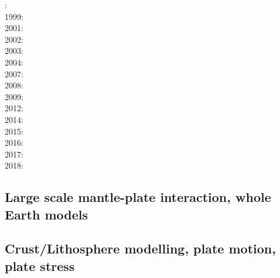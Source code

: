 {\scriptsize
{}: \cite{cava98}\\
1999: \cite{samb99}\cite{samb99b}\\
2001: \cite{bomo01}\cite{kapo01}\\
2002: \cite{shri02}\cite{burb02}\\
2003: \cite{buht03}\\
2004: \cite{isst04}\\
2007: \cite{isks07}\\
2008: \cite{splg08}\cite{ligu08}\\
2009: \cite{wama09}\cite{splg09}\cite{sifg09}\\
2012: \cite{naco12}\\
2014: \cite{wosp14}\cite{hobo14}\cite{licl14}\\
2015: \cite{wahg15}\cite{cobs15}\cite{vybu15}\\
2016: \cite{ghbu16}\cite{bocf16}\cite{yagu16}\cite{baum16}\\
2017: \cite{ligs17}\\
2018: \cite{bofc18}\cite{ghbu18}\cite{cogb18}\cite{ghmc18}
}

\subsection{Large scale mantle-plate interaction, whole Earth models}

\cite{yufl85}
\cite{loja95}
\cite{coli06}
\cite{wamg10}\cite{golw00}\cite{stgb10}\cite{cobe10}
\cite{algs12}\cite{roct12}\cite{crtm12}
\cite{ghbh13}\cite{yahb13}
\cite{macs16}
\cite{hulz18}\cite{osss18b}

\subsection{Crust/Lithosphere modelling, plate motion, plate stress}


